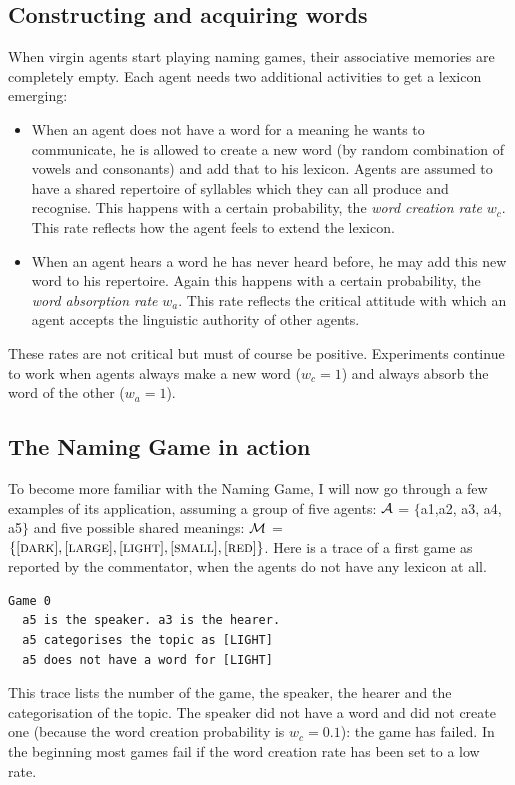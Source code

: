 \subsection{Constructing and acquiring words}

When virgin agents start playing naming games, their 
associative memories are completely empty. Each agent 
needs two additional activities to get a lexicon
emerging: 
\begin{itemize}
\item 
When an agent does not have a word for a
meaning he wants to communicate, he is allowed to create
a new word (by random combination of vowels and 
consonants) and add that to his 
lexicon. Agents are assumed to have a 
shared repertoire of syllables which they can all 
produce and recognise. This happens with a certain 
probability, the {\itshape word creation rate} $w_{c}$. 
This rate reflects how  the agent feels to 
extend the lexicon. 
\item 
When an agent hears a word he has 
never heard before, he may add this new word to his 
repertoire. Again this happens with a certain
probability, the {\itshape word absorption rate} $w_{a}$. 
This rate reflects the critical attitude with which an 
agent accepts the linguistic authority of other agents. 
\end{itemize}
These rates are not critical but must of course
be positive. Experiments continue to work 
when agents always make a new word ($w_{c}=1$) 
and always absorb the word of the other ($w_{a}=1$). 

\subsection{The Naming Game in action}
 
To become more familiar with the Naming Game, I will now 
go through a few examples of its application, assuming 
a group of five agents: ${\cal A}$ = $\{${\bfshape a1},{\bfshape a2},
{\bfshape a3}, {\bfshape a4}, {\bfshape a5}$\}$ and five possible shared meanings: 
${\cal M}$ = $\{[\textsc{dark}],[\textsc{large}],[\textsc{light}],[\textsc{small}],[\textsc{red}]\}$. 
\newline
Here is a trace of a first game as reported by 
the commentator, when the agents do not have any lexicon at
all. 
\begin{verbatim}
Game 0 
  a5 is the speaker. a3 is the hearer. 
  a5 categorises the topic as [LIGHT]
  a5 does not have a word for [LIGHT]
\end{verbatim}
This trace lists the number of the game, the speaker, the 
hearer and the categorisation of
the topic. The speaker did not have a word and did not 
create one (because the word creation probability is 
$w_{c}=0.1$): the game has failed. In the beginning 
most games fail if the word creation rate has been set to a low rate.

